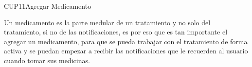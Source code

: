\begin{UseCase}{CUP11}{Agregar Medicamento}
	{
		
		Un medicamento es la parte medular de un tratamiento y no solo del tratamiento, si no de las notificaciones, es por eso que es tan importante el agregar un medicamento, para que se pueda trabajar con el tratamiento de forma activa y se puedan empezar a recibir las notificaciones que le recuerden al usuario cuando tomar sus medicinas.
		
	}
	

\end{UseCase}
